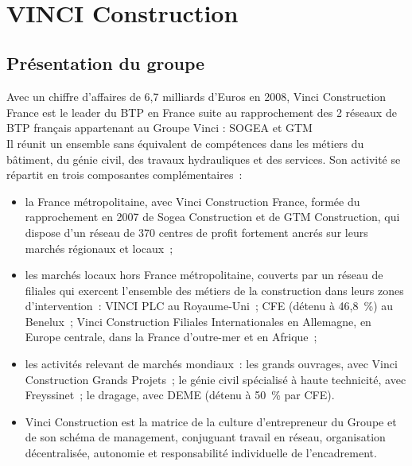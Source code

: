 \documentclass[a4paper]{article}
\begin{document}
\maketitle

\hfill\\
\section {VINCI Construction}

\subsection{Présentation du groupe}

Avec un chiffre d’affaires de 6,7 milliards d’Euros en 2008, Vinci Construction France est le leader du BTP en France suite au rapprochement des 2 réseaux de BTP français appartenant au Groupe Vinci : SOGEA et GTM \\

Il réunit un ensemble sans équivalent de compétences dans les métiers du bâtiment, du génie civil, des travaux hydrauliques et des services.
Son activité se répartit en trois composantes complémentaires :

\begin{itemize}
\item la France métropolitaine, avec Vinci Construction France, formée du rapprochement en 2007 de Sogea Construction et de GTM Construction, qui dispose d’un réseau de 370 centres de profit fortement ancrés sur leurs marchés régionaux et locaux ;
\item les marchés locaux hors France métropolitaine, couverts par un réseau de filiales qui exercent l’ensemble des métiers de la construction dans leurs zones d’intervention : VINCI PLC au Royaume-Uni ; CFE (détenu à 46,8 \%) au Benelux ; Vinci Construction Filiales Internationales en Allemagne, en Europe centrale, dans la France d’outre-mer et en Afrique ;
\item les activités relevant de marchés mondiaux : les grands ouvrages, avec Vinci Construction Grands Projets ; le génie civil spécialisé à haute technicité, avec Freyssinet ; le dragage, avec DEME (détenu à 50 \% par CFE).
\item Vinci Construction est la matrice de la culture d’entrepreneur du Groupe et de son schéma de management, conjuguant travail en réseau, organisation décentralisée, autonomie et responsabilité individuelle de l’encadrement.
\end{itemize}
\end{document}
